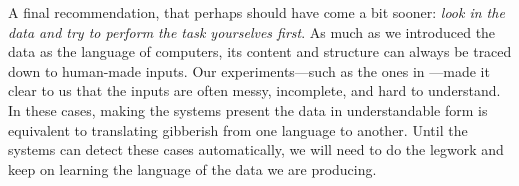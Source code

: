 A final recommendation, that perhaps should have come a bit sooner: \emph{look in the data and try to perform the task yourselves first}. As much as we introduced the data as the language of computers, its content and structure can always be traced down to human-made inputs. Our experiments---such as the ones in ---made it clear to us that the inputs are often messy, incomplete, and hard to understand. In these cases, making the systems present the data in understandable form is equivalent to translating gibberish from one language to another. Until the systems can detect these cases automatically, we will need to do the legwork and keep on learning the language of the data we are producing.